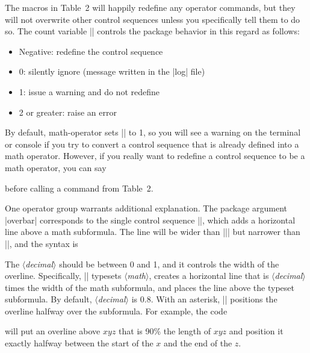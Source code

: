 \documentclass[12pt,twoside]{article}
\def\meta#1{$\langle${\rmfamily\itshape #1}$\rangle$}
\begin{document}
The macros in Table~2 will happily redefine any operator commands, but they will not overwrite other control sequences unless you specifically tell them to do so. The count variable |\operatordefmode| controls the package behavior in this regard as follows:
\begin{itemize}
\item Negative: redefine the control sequence
\item 0: silently ignore (message written in the |log| file)
\item 1: issue a warning and do not redefine
\item 2 or greater: raise an error
\end{itemize}
By default, \textsf{math-operator} sets |\operatordefmode| to 1, so you will see a warning on the terminal or console if you try to convert a control sequence that is already defined into a math operator. However, if you really want to redefine a control sequence to be a math operator, you can say
before calling a command from Table~2.

One operator group warrants additional explanation. The package argument |overbar| corresponds to the single control sequence |\overbar|, which adds a horizontal line above a math subformula. The line will be wider than |\bar| but narrower than |\overline|, and the syntax is
The \meta{decimal} should be between 0 and 1, and it controls the width of the overline. Specifically, |\overbar| typesets \meta{math}, creates a horizontal line that is \meta{decimal} times the width of the math subformula, and places the line above the typeset subformula. By default, \meta{decimal} is 0.8. With an asterisk, |\overbar| positions the overline halfway over the subformula. For example, the code
will put an overline above $xyz$ that is 90\% the length of $xyz$ and position it exactly halfway between the start of the $x$ and the end of the $z$.
\end{document}
